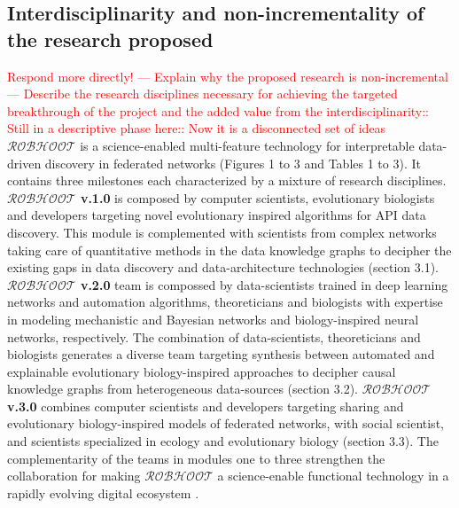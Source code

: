 \documentclass[11pt, a4paper]{article} %
\begin{document}
\subsection{Interdisciplinarity and non-incrementality of the research
  proposed}

\textcolor{red}{Respond more directly! --- Explain why the proposed
  research is non-incremental --- Describe the research disciplines
  necessary for achieving the targeted breakthrough of the project and
  the added value from the interdisciplinarity:: Still in a
  descriptive phase here:: Now it is a disconnected set of ideas} {\bf
  $\mathcal{ROBHOOT}$} is a science-enabled multi-feature technology
for interpretable data-driven discovery in federated networks (Figures
1 to 3 and Tables 1 to 3). It contains three milestones each
characterized by a mixture of research disciplines. {\bf
  $\mathcal{ROBHOOT}$ v.1.0} is composed by computer scientists,
evolutionary biologists and developers targeting novel evolutionary
inspired algorithms for API data discovery. This module is
complemented with scientists from complex networks taking care of
quantitative methods in the data knowledge graphs to decipher the
existing gaps in data discovery and data-architecture technologies
(section 3.1). {\bf $\mathcal{ROBHOOT}$ v.2.0} team is compossed by
data-scientists trained in deep learning networks and automation
algorithms, theoreticians and biologists with expertise in modeling
mechanistic and Bayesian networks and biology-inspired neural
networks, respectively. The combination of data-scientists,
theoreticians and biologists generates a diverse team targeting
synthesis between automated and explainable evolutionary
biology-inspired approaches to decipher causal knowledge graphs from
heterogeneous data-sources (section 3.2). {\bf $\mathcal{ROBHOOT}$
  v.3.0} combines computer scientists and developers targeting sharing
and evolutionary biology-inspired models of federated networks, with
social scientist, and scientists specialized in ecology and
evolutionary biology (section 3.3). The complementarity of the teams
in modules one to three strengthen the collaboration for making
$\mathcal{ROBHOOT}$ a science-enable functional technology in a
rapidly evolving digital ecosystem \citep{Soto-Valero2019}.
\end{document}
